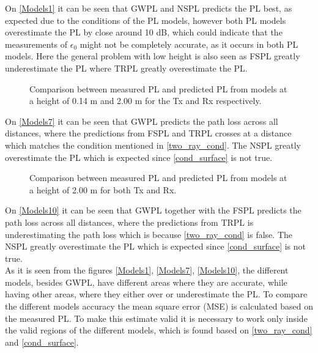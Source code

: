 


On \autoref{Models1} it can be seen that GWPL and NSPL predicts the PL best, as expected due to the conditions of the PL models, however both PL models overestimate the PL by close around 10 dB, which could indicate that the measurements of $\epsilon_0$ might not be completely accurate, as it occurs in both PL models. Here the general problem with low height is also seen as FSPL greatly underestimate the PL where TRPL greatly overestimate the PL.

\begin{figure}[H]
\centering

\caption{Comparison between measured PL and predicted PL from models at a height of 0.14 m and 2.00 m for the Tx and Rx respectively.}
\label{Models7}
\end{figure}

On \autoref{Models7} it can be seen that GWPL predicts the path loss across all distances, where the predictions from FSPL and TRPL crosses at a distance which matches the condition mentioned in \eqref{two_ray_cond}. The NSPL greatly overestimate the PL which is expected since \eqref{cond_surface} is not true.

\begin{figure}[H]
\centering

\caption{Comparison between measured PL and predicted PL from models at a height of 2.00 m for both Tx and Rx.}
\label{Models10}
\end{figure}

On \autoref{Models10} it can be seen that GWPL together with the FSPL predicts the path loss across all distances, where the predictions from TRPL is underestimating the path loss which is because \eqref{two_ray_cond} is false. The NSPL greatly overestimate the PL which is expected since \eqref{cond_surface} is not true.\\



As it is seen from the figures \autoref{Models1}, \autoref{Models7}, \autoref{Models10}, the different models, besides GWPL, have different areas where they are accurate, while having other areas, where they either over or underestimate the PL. To compare the different models accuracy the mean square error (MSE) is calculated based on the measured PL. To make this estimate valid it is necessary to work only inside the valid regions of the different models, which is found based on \eqref{two_ray_cond} and \eqref{cond_surface}. 

